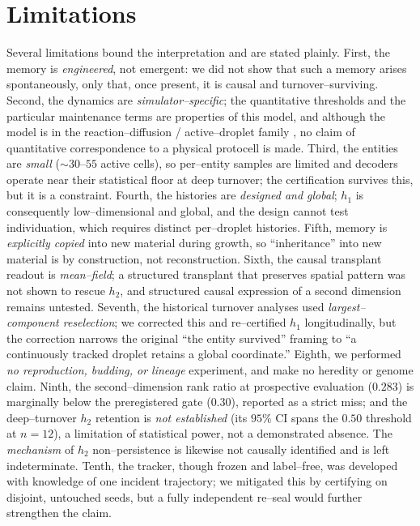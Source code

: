 \documentclass[11pt]{article}
\begin{document}
\section{Limitations}
Several limitations bound the interpretation and are stated plainly. First, the memory is \emph{engineered}, not
emergent: we did not show that such a memory arises spontaneously, only that, once present, it is causal and
turnover--surviving. Second, the dynamics are \emph{simulator--specific}; the quantitative thresholds and the
particular maintenance terms are properties of this model, and although the model is in the reaction--diffusion /
active--droplet family \citep{turing1952,zwicker2017}, no claim of quantitative correspondence to a physical protocell
is made. Third, the entities are \emph{small} ($\sim$$30$--$55$ active cells), so per--entity samples are limited and
decoders operate near their statistical floor at deep turnover; the certification survives this, but it is a
constraint. Fourth, the histories are \emph{designed and global}; $h_1$ is consequently low--dimensional and global,
and the design cannot test individuation, which requires distinct per--droplet histories. Fifth, memory is
\emph{explicitly copied} into new material during growth, so ``inheritance'' into new material is by construction,
not reconstruction. Sixth, the causal transplant readout is \emph{mean--field}; a structured transplant that
preserves spatial pattern was not shown to rescue $h_2$, and structured causal expression of a second dimension
remains untested. Seventh, the historical turnover analyses used \emph{largest--component reselection}; we corrected
this and re--certified $h_1$ longitudinally, but the correction narrows the original ``the entity survived'' framing
to ``a continuously tracked droplet retains a global coordinate.'' Eighth, we performed \emph{no reproduction,
budding, or lineage} experiment, and make no heredity or genome claim. Ninth, the second--dimension rank ratio at prospective evaluation ($0.283$) is marginally below the preregistered gate ($0.30$), reported as a strict miss; and the deep--turnover $h_2$ retention is \emph{not established} (its $95\%$ CI spans the $0.50$ threshold at $n=12$), a limitation of statistical power, not a demonstrated absence. The \emph{mechanism} of $h_2$ non--persistence is likewise not causally identified and is left indeterminate. Tenth, the tracker, though frozen and label--free, was developed with knowledge of one incident
trajectory; we mitigated this by certifying on disjoint, untouched seeds, but a fully independent re--seal would
further strengthen the claim.
\end{document}
